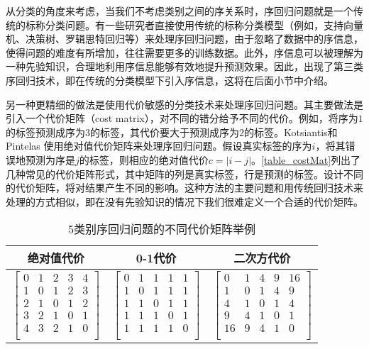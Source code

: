 从分类的角度来考虑，当我们不考虑类别之间的序关系时，序回归问题就是一个传统的标称分类问题。有一些研究者直接使用传统的标称分类模型（例如，支持向量机、决策树、罗辑思特回归等）来处理序回归问题，由于忽略了数据中的序信息，使得问题的难度有所增加，往往需要更多的训练数据。此外，序信息可以被理解为一种先验知识，合理地利用序信息能够有效地提升预测效果。因此，出现了第三类序回归技术，即在传统的分类模型下引入序信息，这将在后面小节中介绍。

另一种更精细的做法是使用代价敏感的分类技术来处理序回归问题。其主要做法是引入一个代价矩阵（cost matrix），对不同的错分给予不同的代价。例如，将序为\(1\)的标签预测成序为\(3\)的标签，其代价要大于预测成序为\(2\)的标签。Kotsiantis和Pintelas\citep{kotsiantis2004cost}
使用绝对值代价矩阵来处理序回归问题。假设真实标签的序为\(i\)，将其错误地预测为序是\(j\)的标签，则相应的绝对值代价\(c = \left |  i - j \right |\)。\autoref{table_costMat}列出了几种常见的代价矩阵形式，其中矩阵的列是真实标签，行是预测的标签。设计不同的代价矩阵，将对结果产生不同的影响。这种方法的主要问题和用传统回归技术来处理的方式相似，即在没有先验知识的情况下我们很难定义一个合适的代价矩阵。

\begin{table}[!htbp]
\caption{5类别序回归问题的不同代价矩阵举例}
\label{table_costMat}
\centering
\begin{tabular}{ccc}
\toprule
绝对值代价 & 0-1代价 & 二次方代价 \\
\midrule
$ \left[
 \begin{matrix}
   0 & 1 & 2 & 3 & 4 \\
   1 & 0 & 1 & 2 & 3 \\
   2 & 1 & 0 & 1 & 2 \\
   3 & 2 & 1 & 0 & 1 \\
   4 & 3 & 2 & 1 & 0 \\
  \end{matrix}
  \right]
$

&

$ \left[
 \begin{matrix}
   0 & 1 & 1 & 1 & 1 \\
   1 & 0 & 1 & 1 & 1 \\
   1 & 1 & 0 & 1 & 1 \\
   1 & 1 & 1 & 0 & 1 \\
   1 & 1 & 1 & 1 & 0 \\
  \end{matrix}
  \right]
$

&

$ \left[
 \begin{matrix}
   0 & 1 & 4 & 9 & 16 \\
   1 & 0 & 1 & 4 & 9  \\
   4 & 1 & 0 & 1 & 4 \\
   9 & 4 & 1 & 0 & 1 \\
   16 & 9 & 4 & 1 & 0 \\
  \end{matrix}
  \right]
$
\\
\bottomrule
\end{tabular}
\end{table}

